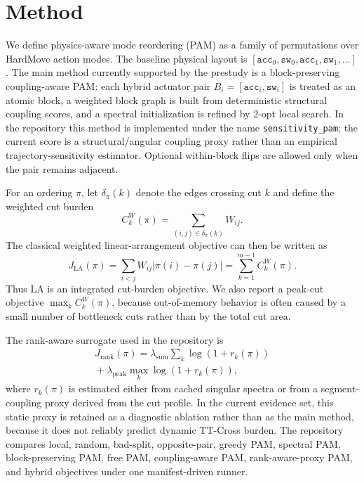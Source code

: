 \section{Method}

We define physics-aware mode reordering (PAM) as a family of permutations over
HardMove action modes. The baseline physical layout is
\([\texttt{acc}_0,\texttt{sw}_0,\texttt{acc}_1,\texttt{sw}_1,\ldots]\). The
main method currently supported by the prestudy is a block-preserving
coupling-aware PAM: each hybrid actuator pair
\(B_i=[\texttt{acc}_i,\texttt{sw}_i]\) is treated as an atomic block, a weighted
block graph is built from deterministic structural coupling scores, and a
spectral initialization is refined by 2-opt local search. In the repository this
method is implemented under the name \texttt{sensitivity\_pam}; the current
score is a structural/angular coupling proxy rather than an empirical
trajectory-sensitivity estimator. Optional within-block flips are allowed only
when the pair remains adjacent.

For an ordering \(\pi\), let \(\delta_\pi(k)\) denote the edges crossing cut
\(k\) and define the weighted cut burden
\begin{equation}
C_k^W(\pi)=\sum_{(i,j)\in \delta_\pi(k)} W_{ij}.
\end{equation}
The classical weighted linear-arrangement objective can then be written as
\begin{equation}
J_{\mathrm{LA}}(\pi)=\sum_{i<j} W_{ij}|\pi(i)-\pi(j)|
= \sum_{k=1}^{m-1} C_k^W(\pi).
\end{equation}
Thus LA is an integrated cut-burden objective. We also report a peak-cut
objective \(\max_k C_k^W(\pi)\), because out-of-memory behavior is often caused
by a small number of bottleneck cuts rather than by the total cut area.

The rank-aware surrogate used in the repository is
\begin{equation}
\begin{aligned}
J_{\mathrm{rank}}(\pi) =
\lambda_{\mathrm{sum}}\sum_k \log(1 + r_k(\pi)) \\
{}+\lambda_{\mathrm{peak}}\max_k \log(1 + r_k(\pi)),
\end{aligned}
\end{equation}
where \(r_k(\pi)\) is estimated either from cached singular spectra or from a
segment-coupling proxy derived from the cut profile. In the current evidence
set, this static proxy is retained as a diagnostic ablation rather than as the
main method, because it does not reliably predict dynamic TT-Cross burden. The
repository compares local, random, bad-split, opposite-pair, greedy PAM,
spectral PAM, block-preserving PAM, free PAM, coupling-aware PAM,
rank-aware-proxy PAM, and hybrid objectives under one manifest-driven runner.
